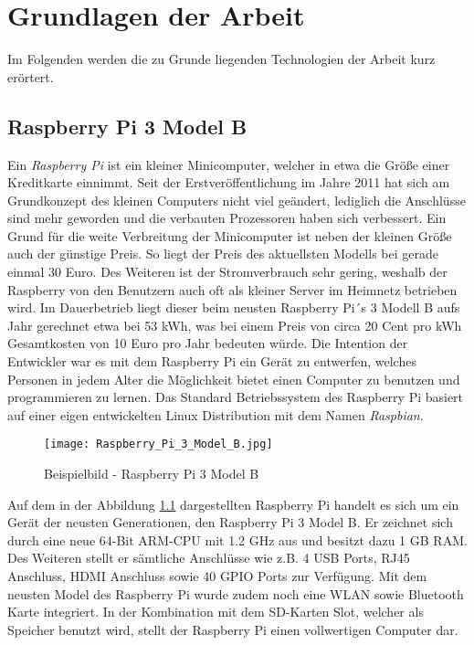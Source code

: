 
\chapter{Grundlagen der Arbeit}

Im Folgenden werden die zu Grunde liegenden Technologien der Arbeit kurz erörtert.

\section{Raspberry Pi 3 Model B}
Ein \textit{Raspberry Pi} ist ein kleiner Minicomputer, welcher in etwa die
Größe einer Kreditkarte einnimmt. Seit der Erstveröffentlichung im Jahre 2011
hat sich am Grundkonzept des kleinen Computers nicht viel
geändert, lediglich die Anschlüsse sind mehr geworden und die verbauten
Prozessoren haben sich verbessert. 
Ein Grund für die weite Verbreitung der Minicomputer ist neben der kleinen
Größe auch der günstige Preis. So liegt der Preis des aktuellsten Modells bei
gerade einmal 30 Euro. Des Weiteren ist der Stromverbrauch sehr gering,
weshalb der Raspberry von den Benutzern auch oft als kleiner Server im Heimnetz
betrieben wird. Im Dauerbetrieb liegt dieser beim neusten Raspberry
Pi´s 3 Modell B aufs Jahr gerechnet etwa bei 53 kWh, was bei einem Preis von
circa 20 Cent pro kWh Gesamtkosten von 10 Euro pro Jahr bedeuten würde. \newline
Die Intention der Entwickler war es mit dem Raspberry Pi ein Gerät zu
entwerfen, welches Personen in jedem Alter die Möglichkeit bietet einen
Computer zu benutzen und programmieren zu lernen. Das Standard Betriebssystem
des Raspberry Pi basiert auf einer eigen entwickelten Linux Distribution mit
dem Namen \textit{Raspbian}.
\autocite{what_is_a_raspberry_pi?_2019}
\begin{figure}[h]
	\centering
	\texttt{[image: Raspberry\_Pi\_3\_Model\_B.jpg]}
	\caption{Beispielbild - Raspberry Pi 3 Model B \autocite{raspberry_pi_2019}}
	\label{img:grafik-RaspberryPi3}
\end{figure}
\newline

Auf dem in der Abbildung \ref{img:grafik-RaspberryPi3} dargestellten Raspberry
Pi handelt es sich um ein Gerät der neusten Generationen, den Raspberry Pi 3
Model B. Er zeichnet sich durch eine neue 64-Bit \ac{ARM}-\ac{CPU} mit 1.2
\ac{GHz} aus und besitzt dazu 1 \ac{GB} \ac{RAM}. Des Weiteren stellt er
sämtliche Anschlüsse wie z.B. 4 \ac{USB} Ports, RJ45 Anschluss, \ac{HDMI}
Anschluss sowie 40 \ac{GPIO} Ports zur Verfügung. Mit dem neusten Model des
Raspberry Pi wurde zudem noch eine \ac{WLAN} sowie Bluetooth Karte integriert.
In der Kombination mit dem \ac{SD-Karten} Slot, welcher als Speicher benutzt
wird, stellt der Raspberry Pi einen vollwertigen Computer dar.
\autocite{kurniawan_2016}
 

